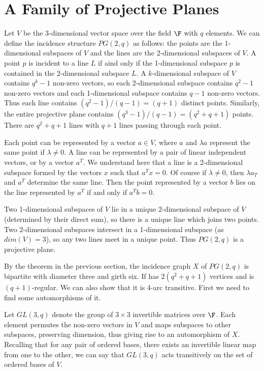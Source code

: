\section*{A Family of Projective Planes}
Let $V$ be the 3-dimensional vector space over the field $\F$ with $q$ elements.  We can define the incidence structure $PG(2,q)$ as follows: the points are the 1-dimensional subspaces of $V$ and the lines are the 2-dimensional subspaces of $V$.  A point $p$ is incident to a line $L$ if aind only if the 1-dimensional subspace $p$ is contained in the 2-dimensional subspace $L$.  A $k$-dimensional subspace of $V$ contains $q^k-1$ non-zero vectors, so each 2-dimensional subspace contains $q^2-1$ non-zero vectors and each 1-dimensional subspace contains $q-1$ non-zero vectors.  Thus each line contains $(q^2-1)/(q-1)=(q+1)$ distinct points.  Similarly, the entire projective plane contains $(q^3-1)/(q-1) = (q^2+q+1)$ points.  There are $ q^2+q+1$ lines with $q+1$ lines passing through each point.

Each point can be represented by a vector $a\in V$, where $a$ and $\lambda a$ represent the same point if $\lambda\neq 0$.  A line can be represented by a pair of linear independent vectors, or by a vector $a^T$.  We understand here that a line is a 2-dimensional subspace formed by the vectors $x$ such that $a^Tx=0$.  Of course if $\lambda\neq 0$, then $\lambda a_T$ and $a^T$ determine the same line.  Then the point represented by a vector $b$ lies on the line represented by $a^T$ if and only if $a^Tb=0$.

Two 1-dimensional subspaces of $V$ lie in a unique 2-dimensional subspace of $V$ (determined by their direct sum), so there is a unique line which joins two points.  Two 2-dimensional subspaces intersect in a 1-dimensional subspace (as $dim(V)=3$), so any two lines meet in a unique point.  Thus $PG(2,q)$ is a projective plane.

By the theorem in the previous section, the incidence graph $X$ of $PG(2,q)$ is bipartite with diameter three and girth six.  If has $2(q^2+q+1)$ vertices and is $(q+1)$-regular.  We can also show that it is 4-arc transitive.  First we need to find some automorphisms of it.

Let $GL(3,q)$ denote the group of $3\times3$ invertible matrices over $\F$.  Each element permutes the non-zero vectors in $V$ and maps subspaces to other subspaces, preserving dimension, thus giving rise to an automorphism of $X$.  Recalling that for any pair of ordered bases, there exists an invertible linear map from one to the other, we can say that $GL(3,q)$ acts transitively on the set of ordered bases of $V$.

